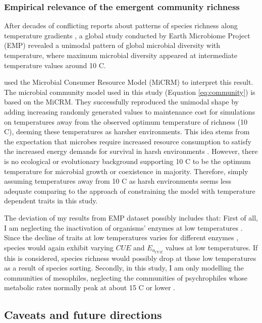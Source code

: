 \documentclass[11pt, a4paper]{article}
\begin{document}
\begin{spacing}{1.5}
\subsubsection{Empirical relevance of the emergent community richness}

After decades of conflicting reports about patterns of species richness along temperature gradients \citep{hendershot2017consistently}, a global study conducted by Earth Microbiome Project (EMP) \citep{thompson2017communal} revealed a unimodal pattern of global microbial diversity with temperature, where maximum microbial diversity appeared at intermediate temperature values around 10 \textdegree C. 

\cite{marsland2020minimal} used the Microbial Consumer Resource Model (MiCRM) to interpret this result. The microbial community model used in this study (Equation \ref{eq:community}) is based on the MiCRM. They successfully reproduced the unimodal shape by adding increasing randomly generated values to maintenance cost for simulations on temperatures away from the observed optimum temperature of richness (10 \textdegree C), deeming these temperatures as harsher environments. This idea stems from the expectation that microbes require increased resource consumption to satisfy the increased energy demands for survival in harsh environments \citep{hoehler2013microbial}. However, there is no ecological or evolutionary background supporting 10 \textdegree C to be the optimum temperature for microbial growth or coexistence in majority. Therefore, simply assuming temperatures away from 10 \textdegree C as harsh environments seems less adequate comparing to the approach of constraining the model with temperature dependent traits in this study. 

The deviation of my results from EMP dataset possibly includes that: First of all, I am neglecting the inactivation of organisms’ enzymes at low temperatures \citep{nedwell1999effect, schoolfield1981non}. Since the decline of traits at low temperatures varies for different enzymes \citep{sharpe1977reaction}, species would again exhibit varying $CUE$ and $E_{a_{CUE}}$ values at low temperatures. If this is considered, species richness would possibly drop at these low temperatures as a result of species sorting. Secondly, in this study, I am only modelling the communities of mesophiles, neglecting the communities of psychrophiles whose metabolic rates normally peak at about 15 \textdegree C or lower \cite{moyer2007psychrophiles}. 

\subsection{Caveats and future directions}


\end{spacing}
\end{document}

